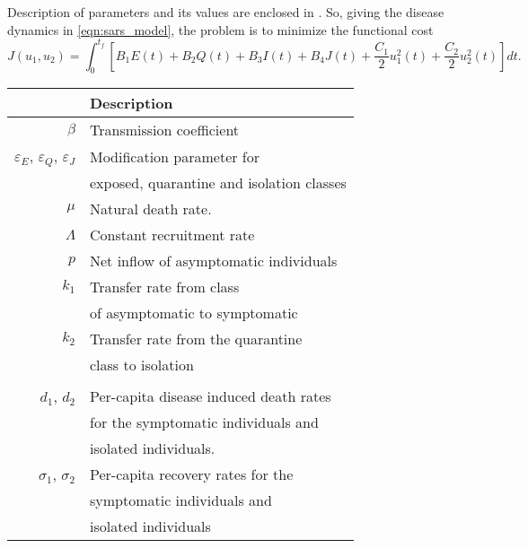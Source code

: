 Description of parameters and its values are enclosed 
in .
So, giving the disease dynamics in \eqref{eqn:sars_model}, the problem is to 
minimize the functional cost
\begin{equation}
  J(u_1,u_2)
    = \int_{0}^{t_f}
      \left[
        B_1 E(t)
        + B_2 Q(t)
        + B_3 I(t)
        + B_4 J(t)
        + \frac{C_1}{2} u_1^2 (t)
        + \frac{C_2}{2} u_2^2 (t)
      \right]
      dt.
\end{equation}
%
\begin{table}[htb]
    \begin{center}
      \begin{tabular}{@{}rl@{}}
        \toprule
        & \multicolumn{1}{l}{\bf{Description}}
        \\
        \midrule
        $\beta$
          & Transmission coefficient
        \\
        $\varepsilon_E$, 
        $\varepsilon_Q$,
        $\varepsilon_J$
          & Modification parameter for 
          \\
          &  exposed, quarantine and isolation classes 
          \\
        $\mu$
          & Natural death rate.
        \\
        $\Lambda$
          & Constant recruitment rate
        \\
        $p$
          & Net inflow of asymptomatic individuals
        \\
        $k_1$ 
          & Transfer rate from class 
          \\
          & of asymptomatic to symptomatic
          \\
        $k_2$
          & Transfer rate from the quarantine 
          \\ 
          & class to isolation
        \\
        \\
        $d_1$, $d_2$
          & Per-capita disease induced death rates 
          \\
          & for the symptomatic individuals and 
          \\
          & isolated individuals.
        \\
        $\sigma_1$, $\sigma_2$
          & Per-capita recovery rates for the 
          \\
          & symptomatic individuals and 
          \\
          &  isolated individuals
        \\

\end{tabular}
\end{center}
\end{table}
